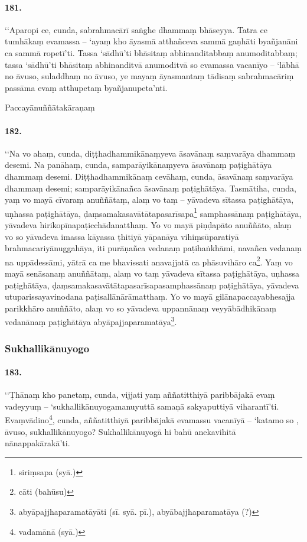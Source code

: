 \paragraph{181.} ‘‘Aparopi ce, cunda, sabrahmacārī saṅghe dhammaṃ bhāseyya. Tatra ce tumhākaṃ evamassa – ‘ayaṃ kho āyasmā atthañceva sammā gaṇhāti byañjanāni ca sammā ropetī’ti. Tassa ‘sādhū’ti bhāsitaṃ abhinanditabbaṃ anumoditabbaṃ; tassa ‘sādhū’ti bhāsitaṃ abhinanditvā anumoditvā so evamassa vacanīyo – ‘lābhā no āvuso, suladdhaṃ no āvuso, ye mayaṃ āyasmantaṃ tādisaṃ sabrahmacāriṃ passāma evaṃ atthupetaṃ byañjanupeta’nti.

Paccayānuññātakāraṇaṃ

\paragraph{182.} ‘‘Na vo ahaṃ, cunda, diṭṭhadhammikānaṃyeva āsavānaṃ saṃvarāya dhammaṃ desemi. Na panāhaṃ, cunda, samparāyikānaṃyeva āsavānaṃ paṭighātāya dhammaṃ desemi. Diṭṭhadhammikānaṃ cevāhaṃ, cunda, āsavānaṃ saṃvarāya dhammaṃ desemi; samparāyikānañca āsavānaṃ paṭighātāya. Tasmātiha, cunda, yaṃ vo mayā cīvaraṃ anuññātaṃ, alaṃ vo taṃ – yāvadeva sītassa paṭighātāya, uṇhassa paṭighātāya, ḍaṃsamakasavātātapasarīsapa\footnote{siriṃsapa (syā.)} samphassānaṃ paṭighātāya, yāvadeva hirikopīnapaṭicchādanatthaṃ. Yo vo mayā piṇḍapāto anuññāto, alaṃ vo so yāvadeva imassa kāyassa ṭhitiyā yāpanāya vihiṃsūparatiyā brahmacariyānuggahāya, iti purāṇañca vedanaṃ paṭihaṅkhāmi, navañca vedanaṃ na uppādessāmi, yātrā ca me bhavissati anavajjatā ca phāsuvihāro ca\footnote{cāti (bahūsu)}. Yaṃ vo mayā senāsanaṃ anuññātaṃ, alaṃ vo taṃ yāvadeva sītassa paṭighātāya, uṇhassa paṭighātāya, ḍaṃsamakasavātātapasarīsapasamphassānaṃ paṭighātāya, yāvadeva utuparissayavinodana paṭisallānārāmatthaṃ. Yo vo mayā gilānapaccayabhesajja parikkhāro anuññāto, alaṃ vo so yāvadeva uppannānaṃ veyyābādhikānaṃ vedanānaṃ paṭighātāya abyāpajjaparamatāya\footnote{abyāpajjhaparamatāyāti (sī. syā. pī.), abyābajjhaparamatāya (?)}.

\subsubsection{Sukhallikānuyogo}

\paragraph{183.} ‘‘Ṭhānaṃ kho panetaṃ, cunda, vijjati yaṃ aññatitthiyā paribbājakā evaṃ vadeyyuṃ – ‘sukhallikānuyogamanuyuttā samaṇā sakyaputtiyā viharantī’ti. Evaṃvādino\footnote{vadamānā (syā.)}, cunda, aññatitthiyā paribbājakā evamassu vacanīyā – ‘katamo so , āvuso, sukhallikānuyogo? Sukhallikānuyogā hi bahū anekavihitā nānappakārakā’ti.

